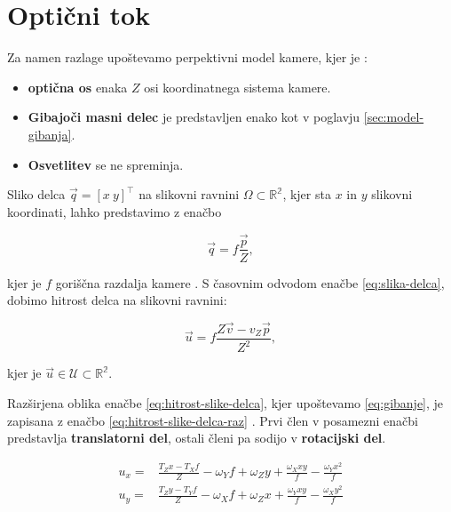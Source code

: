 \section{Optični tok} \label{sec:opticni-tok}
Za namen razlage upoštevamo perpektivni model kamere, kjer je \cite{trucco1998introductory}:

\begin{itemize}
\item \textbf{optična os} enaka $Z$ osi koordinatnega sistema kamere.
\item \textbf{Gibajoči masni delec} je predstavljen enako kot v poglavju \ref{sec:model-gibanja}.
\item \textbf{Osvetlitev} se ne spreminja.
\end{itemize}

Sliko delca $\vec{q} = [x~y]^\top$ na slikovni ravnini $\mathit{\Omega} \subset \mathbb{R^2}$, kjer sta $x$ in $y$ slikovni koordinati, lahko predstavimo z enačbo

\begin{equation}\label{eq:slika-delca}
	\vec{q} = f \frac{\vec{p}}{Z},
\end{equation}

kjer je $f$ goriščna razdalja kamere \cite{trucco1998introductory}. S časovnim odvodom enačbe \eqref{eq:slika-delca}, dobimo hitrost delca na slikovni ravnini:

\begin{equation}\label{eq:hitrost-slike-delca}
	\vec{u} = f \frac{Z\vec{v}-v_Z\vec{p}}{Z^2},
\end{equation}

kjer je $\vec{u} \in \mathcal{U} \subset \mathbb{R^2}$.

Razširjena oblika enačbe \eqref{eq:hitrost-slike-delca}, kjer upoštevamo \eqref{eq:gibanje}, je zapisana z enačbo \eqref{eq:hitrost-slike-delca-raz} \cite{trucco1998introductory}. Prvi člen v posamezni enačbi predstavlja \textbf{translatorni del}, ostali členi pa sodijo v \textbf{rotacijski del}.

\begin{equation}\label{eq:hitrost-slike-delca-raz}
\begin{aligned}
	u_x = & \frac{T_Z x - T_X f}{Z} - \omega_Y f + \omega_Z y + \frac{\omega_X x y}{f} - \frac{\omega_Y x^2}{f} \\
    u_y = & \frac{T_Z y - T_Y f}{Z} - \omega_X f + \omega_Z x + \frac{\omega_Y x y}{f} - \frac{\omega_X y^2}{f}
\end{aligned}
\end{equation}

